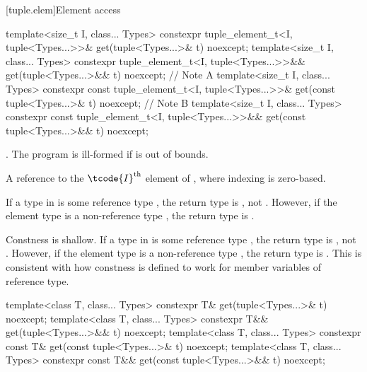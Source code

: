 [tuple.elem]{Element access}

%
\begin{itemdecl}
template<size_t I, class... Types>
  constexpr tuple_element_t<I, tuple<Types...>>&
    get(tuple<Types...>& t) noexcept;
template<size_t I, class... Types>
  constexpr tuple_element_t<I, tuple<Types...>>&&
    get(tuple<Types...>&& t) noexcept;        // Note A
template<size_t I, class... Types>
  constexpr const tuple_element_t<I, tuple<Types...>>&
    get(const tuple<Types...>& t) noexcept;   // Note B
template<size_t I, class... Types>
  constexpr const tuple_element_t<I, tuple<Types...>>&& get(const tuple<Types...>&& t) noexcept;
\end{itemdecl}

\begin{itemdescr}
\pnum
\requires {}.
The program is ill-formed if  is out of bounds.

\pnum
\returns  A reference to the $\tcode{I}^\text{th}$ element of , where
indexing is zero-based.

\pnum
\begin{note}[Note A]
If a type  in  is some reference type ,
the return type is , not .
However, if the element type is a non-reference type ,
the return type is .
\end{note}

\pnum
\begin{note}[Note B]
Constness is shallow.
If a type  in  is some reference type ,
the return type is , not .
However, if the element type is a non-reference type ,
the return type is .
This is consistent with how constness is defined to work
for member variables of reference type.
\end{note}
\end{itemdescr}

%
\begin{itemdecl}
template<class T, class... Types>
  constexpr T& get(tuple<Types...>& t) noexcept;
template<class T, class... Types>
  constexpr T&& get(tuple<Types...>&& t) noexcept;
template<class T, class... Types>
  constexpr const T& get(const tuple<Types...>& t) noexcept;
template<class T, class... Types>
  constexpr const T&& get(const tuple<Types...>&& t) noexcept;
\end{itemdecl}

